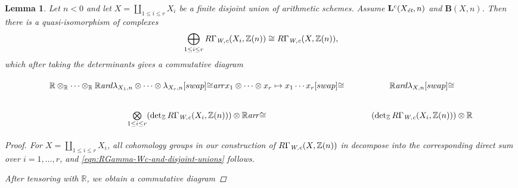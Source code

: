 \documentclass[10pt,a4paper,oneside,draft]{article}
\newcommand{\RR}{\mathbb{R}}
\newcommand{\ZZ}{\mathbb{Z}}
\renewcommand{\det}{\operatorname{det}}
\newcommand{\ar}{\text{\it ar}}
\newcommand{\et}{\text{\it \'{e}t}}
\newcommand{\Wc}{\text{\it W,c}}
\theoremstyle{myplain}
\newtheorem{lemma}[theorem]{Lemma}
\theoremstyle{mydefinition}
\numberwithin{equation}{section}
\begin{document}
\begin{lemma}
  \label{lemma:lambda-and-disjoint-unions}
  Let $n < 0$ and let $X = \coprod_{1 \le i \le r} X_i$ be a finite disjoint
  union of arithmetic schemes. Assume $\mathbf{L}^c (X_\et,n)$ and
  $\mathbf{B} (X,n)$. Then there is a quasi-isomorphism of complexes
  \begin{equation}
    \label{eqn:RGamma-Wc-and-disjoint-unions}
    \bigoplus_{1 \le i \le r} R\Gamma_\Wc (X_i, \ZZ(n)) \cong
    R\Gamma_\Wc (X, \ZZ(n)),
  \end{equation}
  which after taking the determinants gives a commutative diagram

  \begin{equation}
    \label{eqn:lambda-and-disjoint-unions}
    \begin{tikzcd}
      \RR \otimes_\RR \cdots \otimes_\RR \RR\ar{d}{\lambda_{X_1,n}\otimes\cdots\otimes\lambda_{X_r,n}}[swap]{\cong} \ar{r}{x_1\otimes\cdots\otimes x_r \mapsto x_1\cdots x_r}[swap]{\cong} & \RR \ar{d}{\lambda_{X,n}}[swap]{\cong} \\
      \bigotimes\limits_{1 \le i \le r} (\det_\ZZ R\Gamma_\Wc (X_i, \ZZ(n))) \otimes \RR \ar{r}{\cong} & (\det_\ZZ R\Gamma_\Wc (X_i, \ZZ(n))) \otimes \RR
    \end{tikzcd}
  \end{equation}

  \begin{proof}
    For $X = \coprod_{1 \le i \le r} X_i$, all cohomology groups in our
    construction of $R\Gamma_\Wc (X, \ZZ(n))$ in \cite{Beshenov-Weil-etale-1}
    decompose into the corresponding direct sum over $i = 1,\ldots,r$, and
    \eqref{eqn:RGamma-Wc-and-disjoint-unions} follows.

    After tensoring with $\RR$, we obtain a commutative diagram


\end{proof}
\end{lemma}
\end{document}
